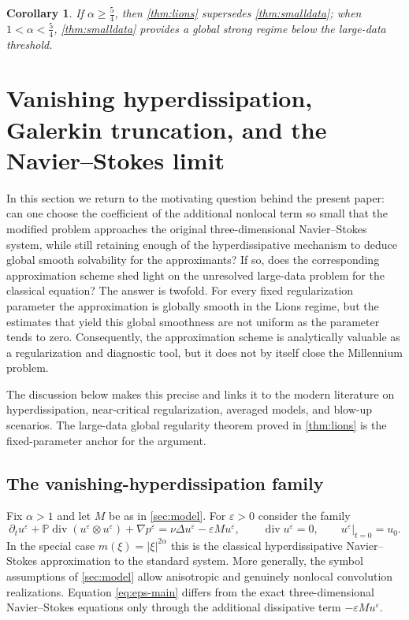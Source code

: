 \documentclass[11pt]{article}
\newtheorem{corollary}[theorem]{Corollary}
\theoremstyle{definition}
\theoremstyle{remark}
\newcommand{\Pcal}{\mathbb{P}}
\newcommand{\diver}{\operatorname{div}}
\begin{document}
\begin{corollary}
If $\alpha\ge \frac54$, then \cref{thm:lions} supersedes \cref{thm:smalldata}; when $1<\alpha<\frac54$, \cref{thm:smalldata} provides a global strong regime below the large-data threshold.
\end{corollary}

\section{Vanishing hyperdissipation, Galerkin truncation, and the Navier--Stokes limit}\label{sec:limit}

In this section we return to the motivating question behind the present paper: can one choose the coefficient of the additional nonlocal term so small that the modified problem approaches the original three-dimensional Navier--Stokes system, while still retaining enough of the hyperdissipative mechanism to deduce global smooth solvability for the approximants? If so, does the corresponding approximation scheme shed light on the unresolved large-data problem for the classical equation? The answer is twofold. For every fixed regularization parameter the approximation is globally smooth in the Lions regime, but the estimates that yield this global smoothness are not uniform as the parameter tends to zero. Consequently, the approximation scheme is analytically valuable as a regularization and diagnostic tool, but it does not by itself close the Millennium problem.

The discussion below makes this precise and links it to the modern literature on hyperdissipation, near-critical regularization, averaged models, and blow-up scenarios. The large-data global regularity theorem proved in \cref{thm:lions} is the fixed-parameter anchor for the argument.

\subsection{The vanishing-hyperdissipation family}

Fix $\alpha>1$ and let $M$ be as in \cref{sec:model}. For $\varepsilon>0$ consider the family
\begin{equation}\label{eq:eps-main}
\partial_t u^\varepsilon + \Pcal\diver(u^\varepsilon\otimes u^\varepsilon)
+\nabla p^\varepsilon
= \nu\Delta u^\varepsilon - \varepsilon M u^\varepsilon,
\qquad \diver u^\varepsilon=0,
\qquad u^\varepsilon|_{t=0}=u_0.
\end{equation}
In the special case $m(\xi)=|\xi|^{2\alpha}$ this is the classical hyperdissipative Navier--Stokes approximation to the standard system. More generally, the symbol assumptions of \cref{sec:model} allow anisotropic and genuinely nonlocal convolution realizations. Equation \eqref{eq:eps-main} differs from the exact three-dimensional Navier--Stokes equations only through the additional dissipative term $-\varepsilon M u^\varepsilon$.
\end{document}

